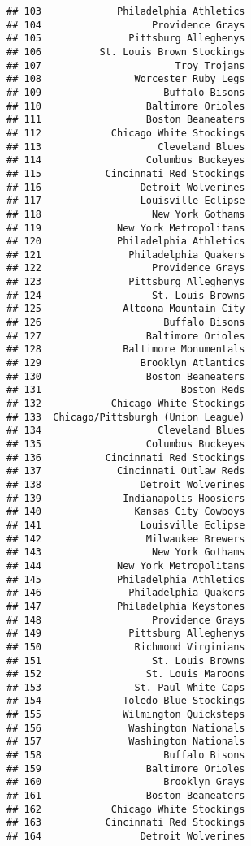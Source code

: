 \documentclass[]{article}
\begin{document}
\begin{verbatim}
## 103             Philadelphia Athletics
## 104                   Providence Grays
## 105               Pittsburg Alleghenys
## 106          St. Louis Brown Stockings
## 107                       Troy Trojans
## 108                Worcester Ruby Legs
## 109                     Buffalo Bisons
## 110                  Baltimore Orioles
## 111                  Boston Beaneaters
## 112            Chicago White Stockings
## 113                    Cleveland Blues
## 114                  Columbus Buckeyes
## 115           Cincinnati Red Stockings
## 116                 Detroit Wolverines
## 117                 Louisville Eclipse
## 118                   New York Gothams
## 119             New York Metropolitans
## 120             Philadelphia Athletics
## 121               Philadelphia Quakers
## 122                   Providence Grays
## 123               Pittsburg Alleghenys
## 124                   St. Louis Browns
## 125              Altoona Mountain City
## 126                     Buffalo Bisons
## 127                  Baltimore Orioles
## 128              Baltimore Monumentals
## 129                 Brooklyn Atlantics
## 130                  Boston Beaneaters
## 131                        Boston Reds
## 132            Chicago White Stockings
## 133  Chicago/Pittsburgh (Union League)
## 134                    Cleveland Blues
## 135                  Columbus Buckeyes
## 136           Cincinnati Red Stockings
## 137             Cincinnati Outlaw Reds
## 138                 Detroit Wolverines
## 139              Indianapolis Hoosiers
## 140                Kansas City Cowboys
## 141                 Louisville Eclipse
## 142                  Milwaukee Brewers
## 143                   New York Gothams
## 144             New York Metropolitans
## 145             Philadelphia Athletics
## 146               Philadelphia Quakers
## 147             Philadelphia Keystones
## 148                   Providence Grays
## 149               Pittsburg Alleghenys
## 150                Richmond Virginians
## 151                   St. Louis Browns
## 152                  St. Louis Maroons
## 153                St. Paul White Caps
## 154              Toledo Blue Stockings
## 155              Wilmington Quicksteps
## 156               Washington Nationals
## 157               Washington Nationals
## 158                     Buffalo Bisons
## 159                  Baltimore Orioles
## 160                     Brooklyn Grays
## 161                  Boston Beaneaters
## 162            Chicago White Stockings
## 163           Cincinnati Red Stockings
## 164                 Detroit Wolverines

\end{verbatim}
\end{document}

